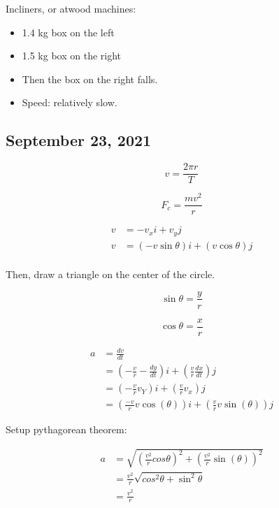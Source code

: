 \documentclass{scrreprt} %
\begin{document}
Incliners, or atwood machines:

\begin{itemize}
	\item 1.4 kg box on the left
	\item 1.5 kg box on the right
	\item Then the box on the right falls.
	\item Speed: relatively slow.
\end{itemize}

\subsection{September 23, 2021}

\begin{theorem}
	$$v = \frac{2\pi r}{T}$$
\end{theorem}

\begin{theorem}

$$F_c = \frac{mv^2}{r}$$

\begin{align*}
	v &= -v_xi + v_yj \\ 
	v &= (-v\sin \theta)i + (v\cos \theta)j \\
\end{align*}

Then, draw a triangle on the center of the circle.

$$\sin \theta = \frac{y}{r}$$

$$\cos \theta = \frac{x}{r}$$

\begin{align*}
	a &= \frac{dv}{dt} \\
	  &= (-\frac{v}{r} - \frac{dy}{dt})i + (\frac{v}{r} \frac{dx}{dt})j \\
	  &= (-\frac{v}{r}v_Y)i + (\frac{v}{r}v_x)j \\
	  &= (\frac{-v}{r}v\cos(\theta))i + (\frac{v}{r}v\sin(\theta))j
\end{align*}

Setup pythagorean theorem:

\begin{align*}
	a &= \sqrt{(\frac{v^2}{r}cos\theta)^2 + (\frac{v^2}{r}\sin(\theta))^2} \\
	  &= \frac{v^2}{r} \sqrt{cos^2 \theta + \sin^2 \theta} \\
	  &= \frac{v^2}{r}
\end{align*}
	
\end{theorem}
\end{document}
